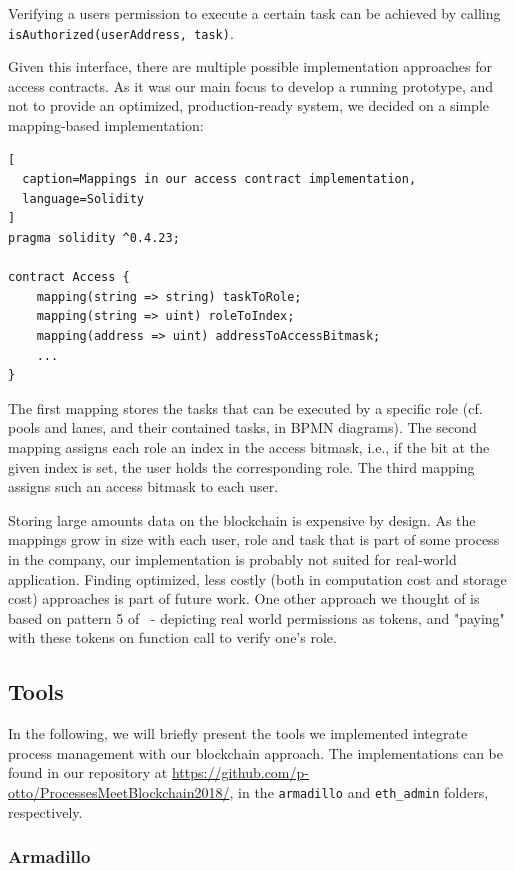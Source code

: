 \documentclass[runningheads]{llncs}
\begin{document}
Verifying a users permission to execute a certain task can be achieved by calling \texttt{isAuthorized(userAddress, task)}.
\newline

Given this interface, there are multiple possible implementation approaches for access contracts.
As it was our main focus to develop a running prototype, and not to provide an optimized, production-ready system, we decided on a simple mapping-based implementation:
\begin{lstlisting}[
  caption=Mappings in our access contract implementation,
  language=Solidity
]
pragma solidity ^0.4.23;

contract Access {
    mapping(string => string) taskToRole;
    mapping(string => uint) roleToIndex;
    mapping(address => uint) addressToAccessBitmask;
    ...
}
\end{lstlisting}
The first mapping stores the tasks that can be executed by a specific role (cf. pools and lanes, and their contained tasks, in BPMN diagrams).
The second mapping assigns each role an index in the access bitmask, i.e., if the bit at the given index is set, the user holds the corresponding role.
The third mapping assigns such an access bitmask to each user.

Storing large amounts data on the blockchain is expensive by design.
As the mappings grow in size with each user, role and task that is part of some process in the company, our implementation is probably not suited for real-world application.
Finding optimized, less costly (both in computation cost and storage cost) approaches is part of future work.
One other approach we thought of is based on pattern 5 of~\cite{xu2018pattern} - depicting real world permissions as tokens, and "paying" with these tokens on function call to verify one's role.

\subsection{Tools}

In the following, we will briefly present the tools we implemented integrate process management with our blockchain approach.
The implementations can be found in our repository at \url{https://github.com/p-otto/ProcessesMeetBlockchain2018/}, in the \texttt{armadillo} and \texttt{eth\_admin} folders, respectively.


\subsubsection{Armadillo}
\end{document}
